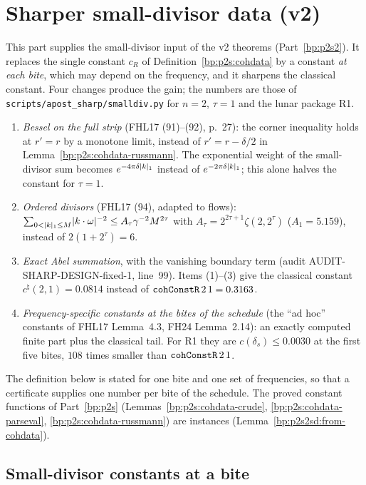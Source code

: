 \section{Sharper small-divisor data (v2)}\label{bp:p2s2sd}

This part supplies the small-divisor input of the v2 theorems (Part~\ref{bp:p2s2}). It replaces the single constant
$c_R$ of Definition~\ref{bp:p2s:cohdata} by a constant \emph{at each bite}, which may depend on the frequency, and it
sharpens the classical constant. Four changes produce the gain; the numbers are those of
\texttt{scripts/apost\_sharp/smalldiv.py} for $n=2$, $\tau=1$ and the lunar package R1.
\begin{enumerate}[label=(\arabic*)]
\item \emph{Bessel on the full strip} (FHL17 (91)--(92), p.~27): the corner inequality holds at $r'=r$ by a monotone limit,
  instead of $r'=r-\delta/2$ in Lemma~\ref{bp:p2s:cohdata-russmann}. The exponential weight of the small-divisor sum becomes
  $e^{-4\pi\delta\lvert k\rvert_1}$ instead of $e^{-2\pi\delta\lvert k\rvert_1}$; this alone halves the constant for $\tau=1$.
\item \emph{Ordered divisors} (FHL17 (94), adapted to flows): $\sum_{0<\lvert k\rvert_1\le M}\lvert k\cdot\omega\rvert^{-2}\le A_\tau\gamma^{-2}M^{2\tau}$ with
  $A_\tau=2^{2\tau+1}\zeta(2,2^\tau)$ ($A_1=5.159$), instead of $2(1+2^\tau)=6$.
\item \emph{Exact Abel summation}, with the vanishing boundary term (audit AUDIT-SHARP-DESIGN-fixed-1, line~99).
  Items (1)--(3) give the classical constant $c^\natural(2,1)=0.0814$ instead of $\texttt{cohConstR}\,2\,1=0.3163$.
\item \emph{Frequency-specific constants at the bites of the schedule} (the ``ad hoc'' constants of FHL17 Lemma~4.3,
  FH24 Lemma~2.14): an exactly computed finite part plus the classical tail. For R1 they are $c(\delta_s)\le0.0030$ at the
  first five bites, $108$ times smaller than $\texttt{cohConstR}\,2\,1$.
\end{enumerate}
The definition below is stated for one bite and one set of frequencies, so that a certificate supplies one number per
bite of the schedule. The proved constant functions of Part~\ref{bp:p2s} (Lemmas~\ref{bp:p2s:cohdata-crude},
\ref{bp:p2s:cohdata-parseval}, \ref{bp:p2s:cohdata-russmann}) are instances (Lemma~\ref{bp:p2s2sd:from-cohdata}).

\subsection{Small-divisor constants at a bite}

